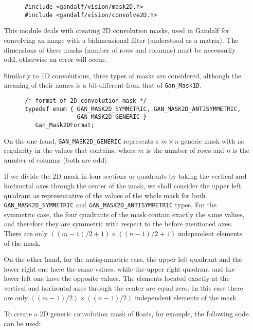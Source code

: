     \begin{verbatim}
      #include <gandalf/vision/mask2D.h>
      #include <gandalf/vision/convolve2D.h>
    \end{verbatim}


    This module deals with creating 2D convolution masks, used in Gandalf 
    for convolving an image with a bidimensional filter (understood as a 
    matrix). The dimensions of these masks (number of rows and columns) must
    be necessarily odd, otherwise an error will occur. 

    Similarly to 1D convolutions, three types of masks are considered, 
    although the meaning of their names is a bit different from that of
    \texttt{Gan\_Mask1D}.
    
    \begin{verbatim}
      /* format of 2D convolution mask */
      typedef enum { GAN_MASK2D_SYMMETRIC, GAN_MASK2D_ANTISYMMETRIC, 
                     GAN_MASK2D_GENERIC }
         Gan_Mask2DFormat;
    \end{verbatim}

    On the one hand, \texttt{GAN\_MASK2D\_GENERIC} represents a $m \times n$ 
    generic mask with no regularity in the values that contains, where
    $m$ is the number of rows and $n$ is the number of columns (both are odd).

    If we divide the 2D mask in four sections or quadrants by taking
    the vertical and horizontal axes through the center of the
    mask, we shall consider the upper left quadrant as representative
    of the values of the whole mask for both \texttt{GAN\_MASK2D\_SYMMETRIC}
    and \texttt{GAN\_MASK2D\_ANTISYMMETRIC} types. For the symmetric case,
    the four quadrants of the mask contain exactly the same values,
    and therefore they are symmetric with respect to the before
    mentioned axes. There are only $((m-1)/2+1) \times ((n-1)/2+1)$ 
    independent elements of the mask. 

    On the other hand, for the
    antisymmetric case, the upper left quadrant and the lower right one
    have the same values, while the upper right quadrant and the lower left
    one have the opposite values. The elements located exactly at the 
    vertical and horizontal axes through the center are equal zero. In this
    case there are only $((m-1)/2) \times ((n-1)/2)$ independent
    elements of the mask.

    To create a 2D generic convolution mask of floats, for example,
    the following code can be used:

